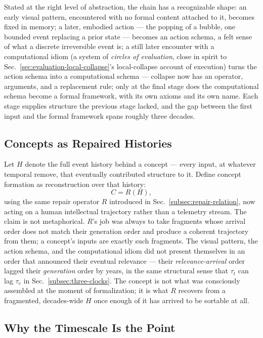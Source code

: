 \documentclass[12pt,a4paper]{article}
\theoremstyle{plain}
\theoremstyle{definition}
\theoremstyle{remark}
\begin{document}
Stated at the right level of abstraction, the chain has a recognizable shape: an early visual pattern, encountered with no formal content attached to it, becomes fixed in memory; a later, embodied action — the popping of a bubble, one bounded event replacing a prior state — becomes an action schema, a felt sense of what a discrete irreversible event is; a still later encounter with a computational idiom (a system of \emph{circles of evaluation}, close in spirit to Sec.~\ref{sec:evaluation-local-collapse}'s local-collapse account of execution) turns the action schema into a computational schema — collapse now has an operator, arguments, and a replacement rule; only at the final stage does the computational schema become a formal framework, with its own axioms and its own name. Each stage supplies structure the previous stage lacked, and the gap between the first input and the formal framework spans roughly three decades.

\subsection{Concepts as Repaired Histories}
\label{subsec:concepts-repaired}

Let $H$ denote the full event history behind a concept — every input, at whatever temporal remove, that eventually contributed structure to it. Define concept formation as reconstruction over that history:
\[
C = R(H),
\]
using the same repair operator $R$ introduced in Sec.~\ref{subsec:repair-relation}, now acting on a human intellectual trajectory rather than a telemetry stream. The claim is not metaphorical. $R$'s job was always to take fragments whose arrival order does not match their generation order and produce a coherent trajectory from them; a concept's inputs are exactly such fragments. The visual pattern, the action schema, and the computational idiom did not present themselves in an order that announced their eventual relevance — their \emph{relevance-arrival} order lagged their \emph{generation} order by years, in the same structural sense that $\tau_t$ can lag $\tau_e$ in Sec.~\ref{subsec:three-clocks}. The concept is not what was consciously assembled at the moment of formalization; it is what $R$ recovers from a fragmented, decades-wide $H$ once enough of it has arrived to be sortable at all.

\subsection{Why the Timescale Is the Point}
\label{subsec:timescale-is-point}
\end{document}
